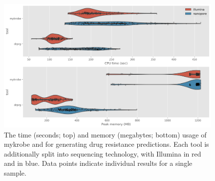 \begin{figure}
\begin{center}
\includegraphics[width=0.90\columnwidth]{Chapter3/Figs/predict-comp-perf.png}
\caption{{The time (seconds; top) and memory (megabytes; bottom) usage of mykrobe and \drprg{} for generating drug resistance predictions. Each tool is additionally split into sequencing technology, with Illumina in red and \ont{} in blue. Data points indicate individual results for a single sample.
{\label{fig:predict-comp-perf}}
}}
\end{center}
\end{figure}


